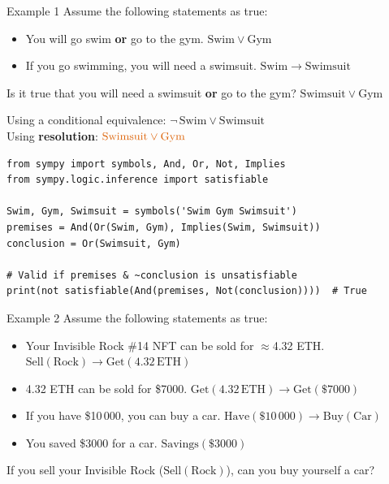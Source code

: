 \documentclass[aspectratio=169]{beamer}
\begin{document}
\begin{frame}[fragile]{Example 1}
  Assume the following statements as true:
  \begin{itemize}
    \item You will go swim \textbf{or} go to the gym. \quad $\mathrm{Swim} \vee \mathrm{Gym}$
    \item If you go swimming, you will need a swimsuit. \quad $\mathrm{Swim} \to \mathrm{Swimsuit}$
  \end{itemize}

  Is it true that you will need a swimsuit \textbf{or} go to the gym?
  $\mathrm{Swimsuit} \vee \mathrm{Gym}$

  \medskip
  Using a conditional equivalence: $\neg\,\mathrm{Swim} \vee \mathrm{Swimsuit}$ \\
  Using \textbf{resolution}: $\textcolor{orangetheme}{\mathrm{Swimsuit} \vee \mathrm{Gym}}$

  \begin{lstlisting}[style=python]
from sympy import symbols, And, Or, Not, Implies
from sympy.logic.inference import satisfiable

Swim, Gym, Swimsuit = symbols('Swim Gym Swimsuit')
premises = And(Or(Swim, Gym), Implies(Swim, Swimsuit))
conclusion = Or(Swimsuit, Gym)

# Valid if premises & ~conclusion is unsatisfiable
print(not satisfiable(And(premises, Not(conclusion))))  # True
  \end{lstlisting}
\end{frame}

\begin{frame}{Example 2}
  Assume the following statements as true:
  \begin{itemize}
    \item Your Invisible Rock \#14 NFT can be sold for $\approx$4.32 ETH. \\
          $\mathrm{Sell(Rock)} \to \mathrm{Get(4.32\,ETH)}$
    \item 4.32 ETH can be sold for \$7000. \quad
          $\mathrm{Get(4.32\,ETH)} \to \mathrm{Get(\$7000)}$
    \item If you have \$10\,000, you can buy a car. \quad
          $\mathrm{Have(\$10\,000)} \to \mathrm{Buy(Car)}$
    \item You saved \$3000 for a car. \quad $\mathrm{Savings(\$3000)}$
  \end{itemize}

  \medskip
  If you sell your Invisible Rock ($\mathrm{Sell(Rock)}$), can you buy yourself a car?
\end{frame}
\end{document}
